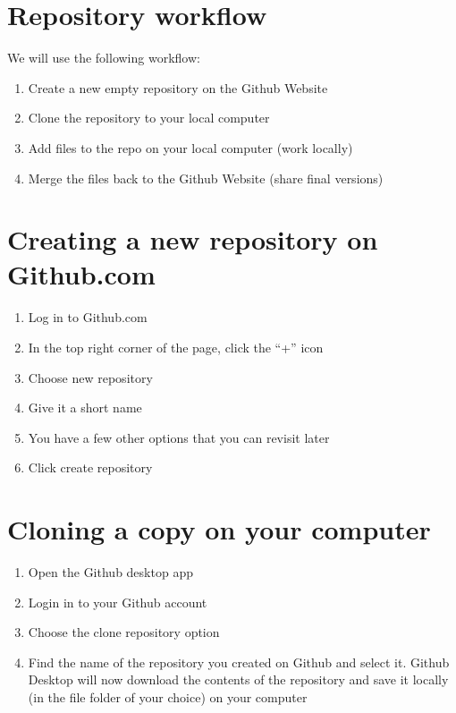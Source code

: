 \documentclass[]{book}
\providecommand{\tightlist}{%
  \setlength{\itemsep}{0pt}\setlength{\parskip}{0pt}}
\begin{document}
\section{Repository workflow}\label{repository-workflow}

We will use the following workflow:

\begin{enumerate}
\def\labelenumi{\arabic{enumi}.}
\tightlist
\item
  Create a new empty repository on the Github Website
\item
  Clone the repository to your local computer
\item
  Add files to the repo on your local computer (work locally)
\item
  Merge the files back to the Github Website (share final versions)
\end{enumerate}

\section{Creating a new repository on
Github.com}\label{creating-a-new-repository-on-github.com}

\begin{enumerate}
\def\labelenumi{\arabic{enumi}.}
\tightlist
\item
  Log in to Github.com
\item
  In the top right corner of the page, click the ``+'' icon
\item
  Choose new repository
\item
  Give it a short name
\item
  You have a few other options that you can revisit later
\item
  Click create repository
\end{enumerate}

\section{Cloning a copy on your
computer}\label{cloning-a-copy-on-your-computer}

\begin{enumerate}
\def\labelenumi{\arabic{enumi}.}
\tightlist
\item
  Open the Github desktop app
\item
  Login in to your Github account
\item
  Choose the clone repository option
\item
  Find the name of the repository you created on Github and select it.
  Github Desktop will now download the contents of the repository and
  save it locally (in the file folder of your choice) on your computer
\end{enumerate}
\end{document}

